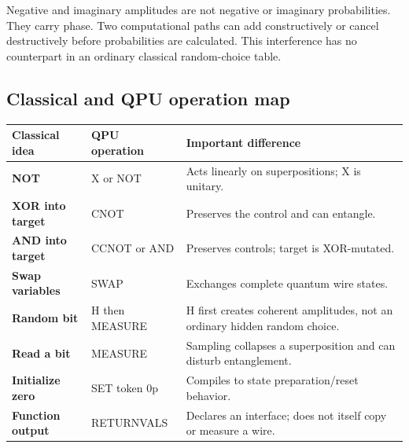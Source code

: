 Negative and imaginary amplitudes are not negative or imaginary probabilities.
They carry phase. Two computational paths can add constructively or cancel
destructively before probabilities are calculated. This interference has no
counterpart in an ordinary classical random-choice table.

\subsection{Classical and QPU operation map}

\begin{center}
\begin{tabularx}{\textwidth}{>{\bfseries}l l X}
\toprule
Classical idea & QPU operation & Important difference\\
\midrule
NOT & X or NOT & Acts linearly on superpositions; X is unitary.\\
XOR into target & CNOT & Preserves the control and can entangle.\\
AND into target & CCNOT or AND & Preserves controls; target is XOR-mutated.\\
Swap variables & SWAP & Exchanges complete quantum wire states.\\
Random bit & H then MEASURE & H first creates coherent amplitudes, not an
ordinary hidden random choice.\\
Read a bit & MEASURE & Sampling collapses a superposition and can disturb
entanglement.\\
Initialize zero & SET token 0p & Compiles to state preparation/reset behavior.\\
Function output & RETURNVALS & Declares an interface; does not itself copy or
measure a wire.\\
\bottomrule
\end{tabularx}
\end{center}

